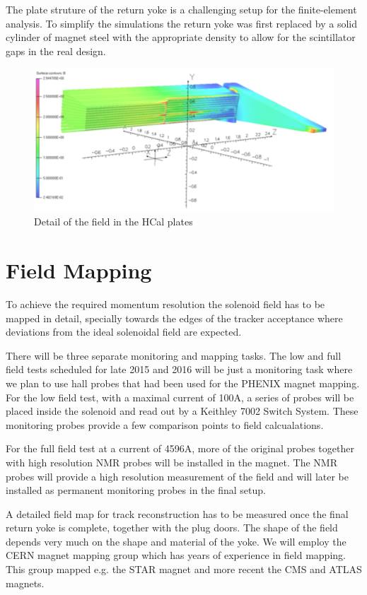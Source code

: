 The plate struture of the return yoke is a challenging setup for the
finite-element analysis. To simplify the simulations the return yoke
was first replaced by a solid cylinder of magnet steel with the appropriate
density to allow for the scintillator gaps in the real design. 

\begin{figure}[]
  \begin{center}
    \includegraphics[width=0.5\linewidth, height=0.3\textwidth]{figs/FieldHCalPlateDetail.pdf}
    \caption{Detail of the field in the HCal plates}
    \label{Opera2D}
  \end{center}
\end{figure}



\section{Field Mapping}
\label{Field_Mapping}

To achieve the required momentum resolution the solenoid field has to
be mapped in detail, specially towards the edges of the tracker
acceptance where deviations from the ideal solenoidal field are
expected.

There will be three separate monitoring and mapping tasks. The low and
full field tests scheduled for late 2015 and 2016 will be just a
monitoring task where we plan to use hall probes that had been used
for the PHENIX magnet mapping. For the low field test, with a maximal
current of 100A, a series of probes will be placed inside the solenoid
and read out by a Keithley 7002 Switch System. These monitoring probes
provide a few comparison points to field calcualations.

For the full field test at a current of 4596A, more of the original probes together
with high resolution NMR probes will be installed in the magnet. The
NMR probes will provide a high resolution measurement of the field and
will later be installed as permanent monitoring probes in the final setup.

A detailed field map for track reconstruction has to be measured once
the final return yoke is complete, together with the plug doors. The
shape of the field depends very much on the shape and material of the
yoke. We will employ the CERN magnet mapping group which has years of
experience in field mapping. This group mapped e.g. the STAR magnet
\cite{Bergsma:2002ac} 
and more recent the CMS \cite{Klyukhin:2011df} and ATLAS \cite{Aleksa:2008zza} magnets.

